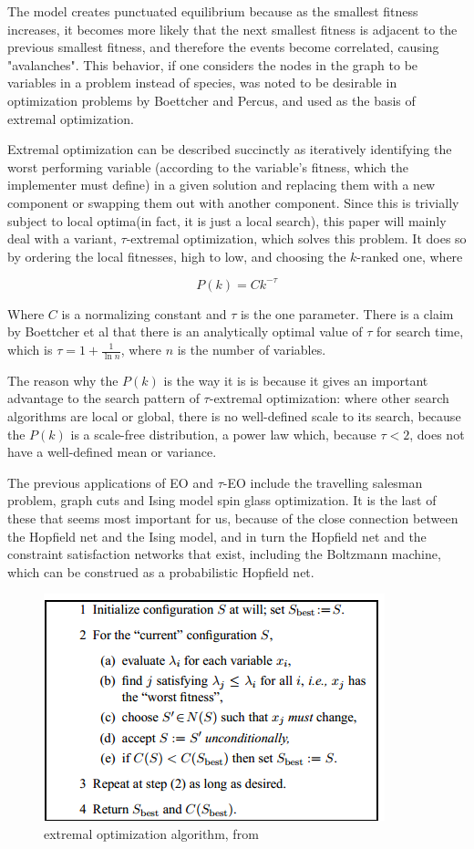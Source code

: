 \documentclass[12pt]{article}
\begin{document}
The model creates punctuated equilibrium because as the smallest fitness increases, it becomes more likely that the next smallest fitness is adjacent to the previous smallest fitness, and therefore the events become correlated, causing "avalanches". This behavior, if one considers the nodes in the graph to be variables in a problem instead of species, was noted to be desirable in optimization problems by Boettcher and Percus\cite{boettcher}, and used as the basis of extremal optimization.

Extremal optimization can be described succinctly as iteratively identifying the worst performing variable (according to the variable's fitness, which the implementer must define) in a given solution and replacing them with a new component or swapping them out with another component. Since this is trivially subject to local optima(in fact, it is just a local search), this paper will mainly deal with a variant, $\tau$-extremal optimization, which solves this problem. It does so by ordering the local fitnesses, high to low, and choosing the $k$-ranked one, where

$$P(k) = Ck^{-\tau}$$

Where $C$ is a normalizing constant and $\tau$ is the one parameter. There is a claim by Boettcher et al that there is an analytically optimal value of $\tau$ for search time, which is $\tau = 1 + \frac{1}{\ln n}$, where $n$ is the number of variables\cite{boettcher2}.

The reason why the $P(k)$ is the way it is is because it gives an important advantage to the search pattern of $\tau$-extremal optimization: where other search algorithms are local or global, there is no well-defined scale to its search, because the $P(k)$ is a scale-free distribution, a power law which, because $\tau < 2$, does not have a well-defined mean or variance. \cite{mejnewman}

The previous applications of EO and $\tau$-EO include the travelling salesman problem, graph cuts and Ising model spin glass optimization\cite{boettcher2}. It is the last of these that seems most important for us, because of the close connection between the Hopfield net and the Ising model\cite{hopfield}, and in turn the Hopfield net and the constraint satisfaction networks that exist, including the Boltzmann machine, which can be construed as a probabilistic Hopfield net.

\begin{figure}
  \includegraphics{eo_alg}
  \caption{extremal optimization algorithm, from \cite{boettcher}}
\end{figure}
\end{document}
